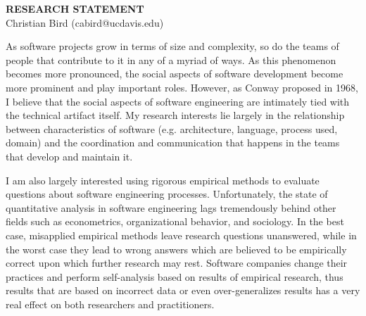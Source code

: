 \documentclass[10pt]{article}
\begin{document}
\thispagestyle{fancy}
\lhead{}
\rhead{}
\renewcommand{\headrulewidth}{0pt} 
\renewcommand{\footrulewidth}{0pt} 
\fancyfoot[C]{\footnotesize \textcolor{gray}{http://wwwcsif.ucdavis.edu/$\sim$bird/index.html}}


\pagestyle{fancy}
\lhead{\textcolor{gray}{\it Christian Bird, Research Statement}}
\rhead{\textcolor{gray}{\thepage/\totalpages{}}}

\begin{small}

\begin{center}
{\LARGE \bf RESEARCH STATEMENT}\\
\vspace*{0.1cm}
{\normalsize Christian Bird (cabird@ucdavis.edu)}
\end{center}



As software projects grow in terms of size and complexity, so do the teams of
people that contribute to it in any of a myriad of ways.  As this phenomenon
becomes more pronounced, the social aspects of software development become more
prominent and play important roles.  However, as Conway proposed in 1968, I
believe that the social aspects of software engineering are intimately tied
with the technical artifact itself.  My research interests lie largely in the
relationship between characteristics of software (e.g. architecture, language,
process used, domain) and the coordination and communication that happens in the
teams that develop and maintain it.

I am also largely interested using rigorous empirical methods to evaluate
questions about software engineering processes.  Unfortunately, the state
of quantitative analysis in software engineering lags tremendously behind
other fields such as econometrics, organizational behavior, and sociology.
In the best case, misapplied empirical methods leave research questions
unanswered, while in the worst case they lead to wrong answers which are believed
to be empirically correct upon which further research may rest.  Software
companies change their practices and perform self-analysis based on results
of empirical research, thus results that are based on incorrect data or even
over-generalizes results has a very real effect on both researchers and 
practitioners.


\end{small}
\end{document}
